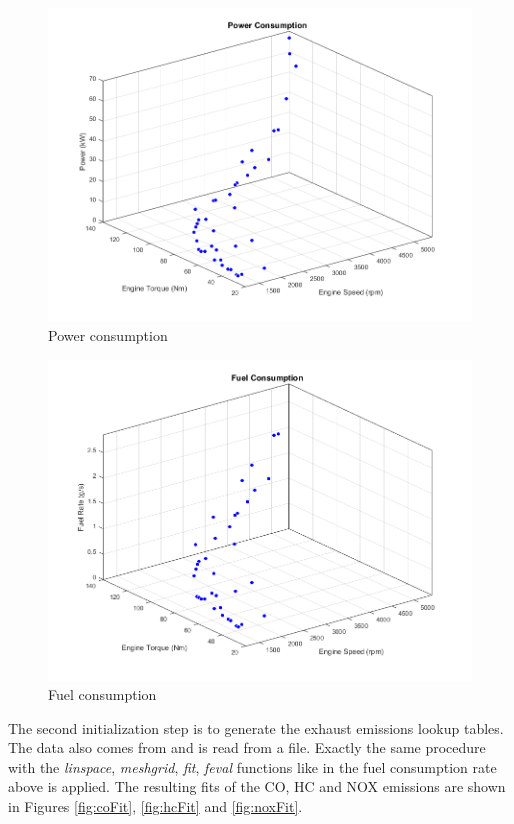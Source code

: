 \begin{figure}[h]
\centering
\includegraphics[scale=0.4]{figures/power}
\caption{Power consumption}
\label{fig:powerFit}
\end{figure}

\begin{figure}[h]
\centering
\includegraphics[scale=0.4]{figures/fuel}
\caption{Fuel consumption}
\label{fig:fuelFit}
\end{figure}


The second initialization step is to generate the exhaust emissions lookup tables. The data also comes from \citet{argonne1999} and is read from a file. Exactly the same procedure with the \textit{linspace}, \textit{meshgrid}, \textit{fit}, \textit{feval} functions like in the fuel consumption rate above is applied. The resulting fits of the CO, HC and NOX emissions are shown in Figures \ref{fig:coFit}, \ref{fig:hcFit} and \ref{fig:noxFit}.

